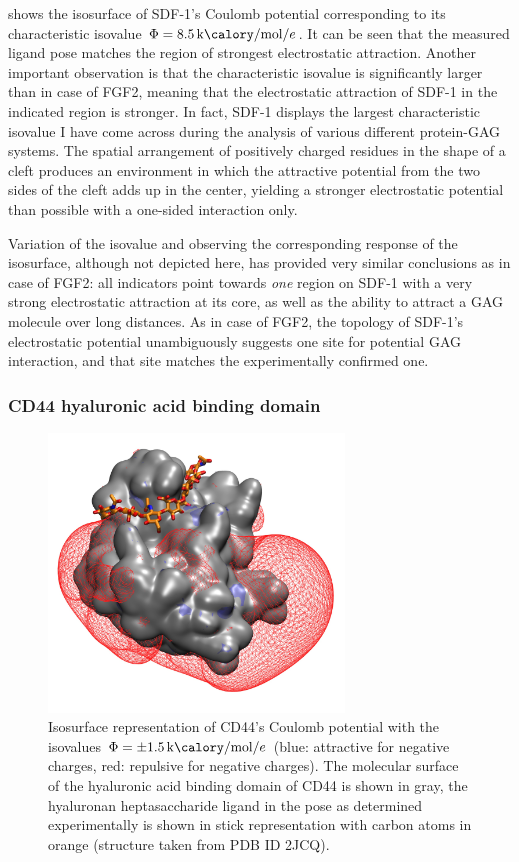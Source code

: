  shows the isosurface of SDF-1's Coulomb potential
corresponding to its characteristic isovalue
$\Phi=\SI{8.5}{\kilo\calory\per\mole\per\elementarycharge}$. It can be seen that
the measured ligand pose matches the region of strongest electrostatic
attraction. Another important observation is that the characteristic isovalue is
significantly larger than in case of FGF2, meaning that the electrostatic
attraction of SDF-1 in the indicated region is stronger. In fact, SDF-1 displays
the largest characteristic isovalue I have come across during the analysis of
various different protein-GAG systems. The spatial arrangement of positively
charged residues in the shape of a cleft produces an environment in which the
attractive potential from the two sides of the cleft adds up in the center,
yielding a stronger electrostatic potential than possible with a one-sided
interaction only.

Variation of the isovalue and observing the corresponding response of the
isosurface, although not depicted here, has provided very similar conclusions as
in case of FGF2: all indicators point towards \textit{one} region on SDF-1 with
a very strong electrostatic attraction at its core, as well as the ability to
attract a GAG molecule over long distances. As in case of FGF2, the topology of
SDF-1's electrostatic potential unambiguously suggests one site for potential
GAG interaction, and that site matches the experimentally confirmed one.


\subsubsection{CD44 hyaluronic acid binding domain}

\begin{figure}
\centering
\includegraphics[width=0.7\textwidth]{gfx/bspred/2JCQ_isopot500_ligand_view1.jpg}
\caption[]{
Isosurface representation of CD44's Coulomb potential with the isovalues
$\Phi=\pm\SI{1.5}{\kilo\calory\per\mole\per\elementarycharge}$ (blue: attractive
for negative charges, red: repulsive for negative charges). The molecular
surface of the hyaluronic acid binding domain of CD44 is shown in gray, the
hyaluronan heptasaccharide ligand in the pose as determined experimentally is
shown in stick representation with carbon atoms in orange (structure taken from
PDB ID 2JCQ).}
\label{fig:bspred:cd44_estatic}
\end{figure}

